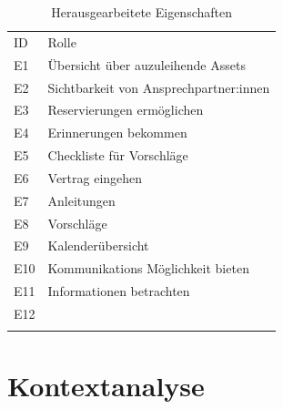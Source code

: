 \begin{table}[h]
        \centering
        \caption{Herausgearbeitete Eigenschaften}
        \begin{tabular}{ll}
                \arrayrulecolor{maincolor}\hline
                \sffamily\color{maincolor}ID & \sffamily\color{maincolor}Rolle
                \\
                \arrayrulecolor{maincolor}\hline
                E1                           & Übersicht über auzuleihende
                Assets                                                           \\
                E2                           & Sichtbarkeit von
                Ansprechpartner:innen                                            \\
                E3                           & Reservierungen ermöglichen
                \\
                E4                           & Erinnerungen bekommen
                \\
                E5                           & Checkliste für Vorschläge
                \\
                E6                           & Vertrag eingehen
                \\
                E7                           & Anleitungen
                \\
                E8                           & Vorschläge
                \\
                E9                           & Kalenderübersicht
                \\
                E10                          & Kommunikations Möglichkeit bieten
                \\
                E11                          & Informationen betrachten
                \\
                E12                          &
                \\
                \arrayrulecolor{maincolor}\hline
        \end{tabular}
        \label{table:e}
        \hfill
\end{table}




\section{Kontextanalyse}
\label{section:kontext}

